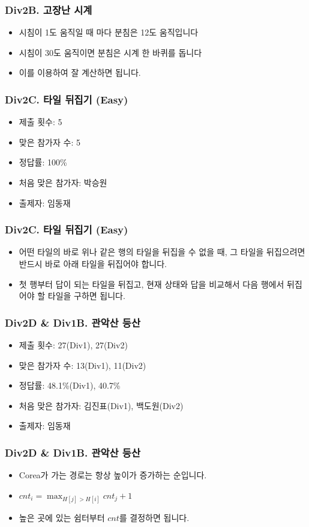 \documentclass[xetex]{beamer}
\begin{document}
\begin{frame}
  \frametitle{Div2B. 고장난 시계}
  \begin{itemize}
    \item 시침이 1도 움직일 때 마다 분침은 12도 움직입니다
    \item 시침이 30도 움직이면 분침은 시계 한 바퀴를 돕니다
    \item 이를 이용하여 잘 계산하면 됩니다.
  \end{itemize}
\end{frame}

\begin{frame}
  \frametitle{Div2C. 타일 뒤집기 (Easy)}
  \begin{itemize}
    \item 제출 횟수: 5
    \item 맞은 참가자 수: 5
    \item 정답률: 100\%
    \item 처음 맞은 참가자: 박승원
    \item 출제자: 임동재
  \end{itemize}
\end{frame}

\begin{frame}
  \frametitle{Div2C. 타일 뒤집기 (Easy)}
  \begin{itemize}
    \item 어떤 타일의 바로 위나 같은 행의 타일을 뒤집을 수 없을 때, 그 타일을 뒤집으려면 반드시 바로 아래 타일을 뒤집어야 합니다.
    \item 첫 행부터 답이 되는 타일을 뒤집고, 현재 상태와 답을 비교해서 다음 행에서 뒤집어야 할 타일을 구하면 됩니다.
  \end{itemize}
\end{frame}

\begin{frame}
  \frametitle{Div2D \& Div1B. 관악산 등산}
  \begin{itemize}
    \item 제출 횟수: 27(Div1), 27(Div2)
    \item 맞은 참가자 수: 13(Div1), 11(Div2)
    \item 정답률: 48.1\%(Div1), 40.7\%
    \item 처음 맞은 참가자: 김진표(Div1), 백도원(Div2)
    \item 출제자: 임동재
  \end{itemize}
\end{frame}

\begin{frame}
  \frametitle{Div2D \& Div1B. 관악산 등산}
  \begin{itemize}
    \item Corea가 가는 경로는 항상 높이가 증가하는 순입니다.
    \item $cnt_{i} = \max_{H[j] > H[i]} cnt_{j} + 1$
    \item 높은 곳에 있는 쉼터부터 $cnt$를 결정하면 됩니다.
  \end{itemize}
\end{frame}
\end{document}
